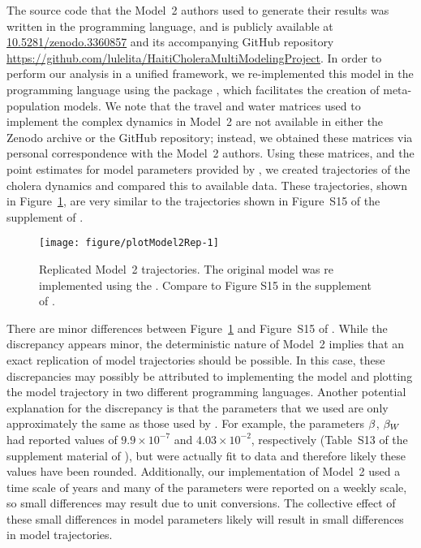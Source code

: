 The source code that the Model~2 authors used to generate their results was written in the  programming language, and is publicly available at \url{10.5281/zenodo.3360857} and its accompanying GitHub repository \url{https://github.com/lulelita/HaitiCholeraMultiModelingProject}.
In order to perform our analysis in a unified framework, we re-implemented this model in the  programming language using the  package \citep{asfaw24}, which facilitates the creation of meta-population models.
We note that the travel and water matrices used to implement the complex dynamics in Model~2 are not available in either the Zenodo archive or the GitHub repository;
instead, we obtained these matrices via personal correspondence with the Model~2 authors.
Using these matrices, and the point estimates for model parameters provided by \citet{lee20}, we created trajectories of the cholera dynamics and compared this to available data.
These trajectories, shown in Figure~\ref{fig:mod2rep}, are very similar to the trajectories shown in Figure~S15 of the supplement of \citet{lee20}.




\begin{figure}[!h]
\begin{knitrout}
\color{fgcolor}
\texttt{[image: figure/plotModel2Rep-1]} 
\end{knitrout}
\caption[Replicated Model~2 trajectories.]{\label{fig:mod2rep}
Replicated Model~2 trajectories. The original model was re implemented using the . Compare to Figure S15 in the supplement of \citet{lee20}.
}
\end{figure}

There are minor differences between Figure~\ref{fig:mod2rep} and Figure~S15 of \citet{lee20}.
While the discrepancy appears minor, the deterministic nature of Model~2 implies that an exact replication of model trajectories should be possible.
In this case, these discrepancies may possibly be attributed to implementing the model and plotting the model trajectory in two different programming languages.
Another potential explanation for the discrepancy is that the parameters that we used are only approximately the same as those used by \citet{lee20}.
For example, the parameters $\beta$, $\beta_{W}$ had reported values of $9.9 \times 10^{-7}$ and $4.03 \times 10^{-2}$, respectively (Table~S13 of the supplement material of \citet{lee20}), but were actually fit to data and therefore likely these values have been rounded.
Additionally, our implementation of Model~2 used a time scale of years and many of the parameters were reported on a weekly scale, so small differences may result due to unit conversions.
The collective effect of these small differences in model parameters likely will result in small differences in model trajectories.

